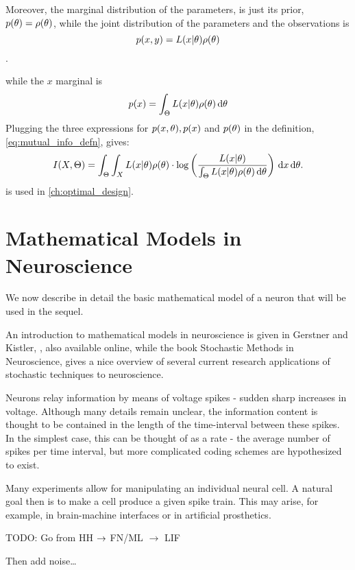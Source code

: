 Moreover, the marginal distribution of the parameters, is just its prior,
$p({ \theta}) = \rho({ \theta})$, while the joint distribution of the parameters and the
observations is $$p(x,y) = L(x|{ \theta})\rho({ \theta})$$.

while the $x$ marginal is $$p(x) = \int_\Theta L(x|{ \theta})\rho({ \theta}) \, \mathrm{d} { \theta}$$
Plugging the three expressions for $p(x,{ \theta}), p(x)$ and $p({ \theta})$ in the
definition, \cref{eq:mutual_info_defn}, gives:
\begin{equation}
I(X,{\Theta}) = \int_\Theta \int_X L(x|{ \theta})\rho({ \theta}) \cdot 
\log \left( \frac{L(x|{ \theta}) }
				{\int_\Theta L(x|{ \theta})\rho({ \theta}) \, \mathrm{d} { \theta}  } \right)
\, \mathrm{d} x\, \mathrm{d} { \theta}.
\label{eq:mutual_info_posterior_vs_observations} 
\end{equation} 
  is used in
\cref{ch:optimal_design}.




\section{Mathematical Models in Neuroscience}
\label{sec:math_models_in_neuroscience}
We now describe in detail the basic mathematical model of a neuron that will be
used in the sequel. 

An introduction to mathematical models in neuroscience is given in Gerstner and
Kistler, \cite{Gerstner2002}, also available online, while the book Stochastic
Methods in Neuroscience, \cite{Laing2009} gives a nice overview of several
current research applications of stochastic techniques to neuroscience.


Neurons relay information by means of voltage spikes - sudden sharp increases in
voltage. Although many details remain unclear, the information content is
thought to be contained in the length of the time-interval between these spikes.
In the simplest case, this can be thought of as a rate - the average number of
spikes per time interval, but more complicated coding schemes are hypothesized to
exist. 

Many experiments allow for manipulating an individual neural cell. A natural
goal then is to make a cell produce a given spike train. This may arise, for
example, in brain-machine interfaces or in artificial prosthetics. 


TODO: Go from HH ${\rightarrow}$ FN/ML  $\rightarrow$ LIF

Then add noise\ldots

